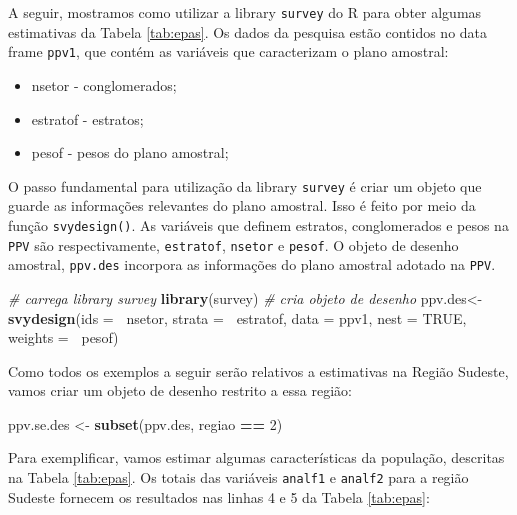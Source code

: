 \documentclass[]{book}
\newenvironment{Shaded}{\begin{snugshade}}{\end{snugshade}}
\newcommand{\KeywordTok}[1]{\textcolor[rgb]{0.13,0.29,0.53}{\textbf{#1}}}
\newcommand{\DataTypeTok}[1]{\textcolor[rgb]{0.13,0.29,0.53}{#1}}
\newcommand{\DecValTok}[1]{\textcolor[rgb]{0.00,0.00,0.81}{#1}}
\newcommand{\StringTok}[1]{\textcolor[rgb]{0.31,0.60,0.02}{#1}}
\newcommand{\CommentTok}[1]{\textcolor[rgb]{0.56,0.35,0.01}{\textit{#1}}}
\newcommand{\OtherTok}[1]{\textcolor[rgb]{0.56,0.35,0.01}{#1}}
\newcommand{\OperatorTok}[1]{\textcolor[rgb]{0.81,0.36,0.00}{\textbf{#1}}}
\newcommand{\NormalTok}[1]{#1}
\providecommand{\tightlist}{%
  \setlength{\itemsep}{0pt}\setlength{\parskip}{0pt}}
\theoremstyle{definition}
\theoremstyle{definition}
\theoremstyle{definition}
\theoremstyle{remark}
\begin{document}
A seguir, mostramos como utilizar a library \texttt{survey}
\citep{R-survey} do R para obter algumas estimativas da Tabela
\ref{tab:epas}. Os dados da pesquisa estão contidos no data frame
\texttt{ppv1}, que contém as variáveis que caracterizam o plano
amostral:

\begin{itemize}
\tightlist
\item
  nsetor - conglomerados;
\item
  estratof - estratos;
\item
  pesof - pesos do plano amostral;
\end{itemize}

O passo fundamental para utilização da library \texttt{survey}
\citep{R-survey} é criar um objeto que guarde as informações relevantes
do plano amostral. Isso é feito por meio da função \texttt{svydesign()}.
As variáveis que definem estratos, conglomerados e pesos na \texttt{PPV}
são respectivamente, \texttt{estratof}, \texttt{nsetor} e
\texttt{pesof}. O objeto de desenho amostral, \texttt{ppv.des} incorpora
as informações do plano amostral adotado na \texttt{PPV}.

\begin{Shaded}
\begin{Highlighting}[]
\CommentTok{# carrega library survey}
\KeywordTok{library}\NormalTok{(survey)}
\CommentTok{# cria objeto de desenho}
\NormalTok{ppv.des<-}\KeywordTok{svydesign}\NormalTok{(}\DataTypeTok{ids =} \OperatorTok{~}\NormalTok{nsetor, }\DataTypeTok{strata =} \OperatorTok{~}\NormalTok{estratof,}
\DataTypeTok{data =}\NormalTok{ ppv1, }\DataTypeTok{nest =} \OtherTok{TRUE}\NormalTok{, }\DataTypeTok{weights =} \OperatorTok{~}\NormalTok{pesof)}
\end{Highlighting}
\end{Shaded}

Como todos os exemplos a seguir serão relativos a estimativas na Região
Sudeste, vamos criar um objeto de desenho restrito a essa região:

\begin{Shaded}
\begin{Highlighting}[]
\NormalTok{ppv.se.des <-}\StringTok{ }\KeywordTok{subset}\NormalTok{(ppv.des, regiao }\OperatorTok{==}\StringTok{ }\DecValTok{2}\NormalTok{)}
\end{Highlighting}
\end{Shaded}

Para exemplificar, vamos estimar algumas características da população,
descritas na Tabela \ref{tab:epas}. Os totais das variáveis
\texttt{analf1} e \texttt{analf2} para a região Sudeste fornecem os
resultados nas linhas 4 e 5 da Tabela \ref{tab:epas}:
\end{document}
